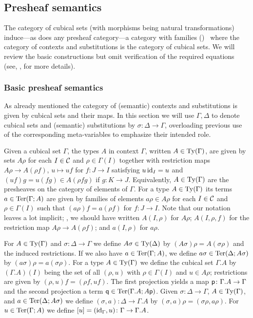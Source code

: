 \subsection{Presheaf semantics}
\label{sec:presheaf-semantics}

The category of cubical sets (with morphisms being natural
transformations) induce---as does any presheaf category---a category
with families (\cwf)~\cite{Dybjer96} where the category of contexts
and substitutions is the category of cubical sets.  We will review the
basic constructions but omit verification of the required equations
(see, \eg{}, \cite{Hofmann97,simonlic,BCH} for more details).

\subsubsection*{Basic presheaf semantics}

As already mentioned the category of (semantic) contexts and
substitutions is given by cubical sets and their maps.  In this
section we will use $\Gamma,\Delta$ to denote cubical sets and
(semantic) substitutions by $\sigma \colon \Delta \to \Gamma$,
overloading previous use of the corresponding meta-variables to
emphasize their intended role.

Given a cubical set $\Gamma$, the types $A$ in context $\Gamma$,
written $A \in \operatorname{Ty}(\Gamma)$, are given by sets $A \rho$ for each $I
\in \mathcal{C}$ and $\rho \in \Gamma (I)$ together with restriction maps $A
\rho \to A (\rho f)$, $u \mapsto u f$ for $f \colon J \to I$
satisfying $u \, \mathrm{id}_I = u$ and $(u f) g = u (f g) \in A (\rho f g)$
if $g \colon K \to J$. Equivalently, $A \in \operatorname{Ty} (\Gamma)$ are the
presheaves on the category of elements of $\Gamma$. For a type $A \in
\operatorname{Ty}(\Gamma)$ its terms $a \in \operatorname{Ter} (\Gamma; A)$ are given by families
of elements $a \rho \in A \rho$ for each $I \in \mathcal{C}$ and $\rho \in
\Gamma (I)$ such that $(a\rho) f = a (\rho f)$ for $f \colon J \to I$.
Note that our notation leaves a lot implicit; \eg{}, we should have
written $A (I,\rho)$ for $A \rho$; $A (I,\rho,f)$ for the restriction
map $A \rho \to A (\rho f)$; and $a (I,\rho)$ for $a \rho$.

For $A \in \operatorname{Ty}(\Gamma)$ and $\sigma \colon \Delta \to \Gamma$ we
define $A \sigma \in \operatorname{Ty}(\Delta)$ by $(A \sigma) \rho = A (\sigma
\rho)$ and the induced restrictions.  If we also have $a \in \operatorname{Ter}
(\Gamma;A)$, we define $a \sigma \in \operatorname{Ter} (\Delta; A \sigma)$ by $(a
\sigma) \rho = a (\sigma \rho)$.  For a type $A \in \operatorname{Ty} (\Gamma)$ we
define the cubical set $\Gamma.A$ by $(\Gamma.A) (I)$ being the set of
all $(\rho,u)$ with $\rho \in \Gamma (I)$ and $u \in A \rho$;
restrictions are given by $(\rho,u) f = (\rho f, u f)$.  The first
projection yields a map ${\sf p} \colon \Gamma.A \to \Gamma$ and the
second projection a term ${\sf q} \in \operatorname{Ter} (\Gamma.A; A {\sf p})$.  Given
$\sigma \colon \Delta \to \Gamma$, $A \in \operatorname{Ty}(\Gamma)$, and $a \in
\operatorname{Ter}(\Delta;A \sigma)$ we define $(\sigma,a) \colon \Delta \to
\Gamma.A$ by $(\sigma,a) \rho = (\sigma \rho, a \rho)$.  For $u \in
\operatorname{Ter} (\Gamma;A)$ we define $[u] = (\mathrm{id}_\Gamma, u) \colon \Gamma \to
\Gamma.A$.

